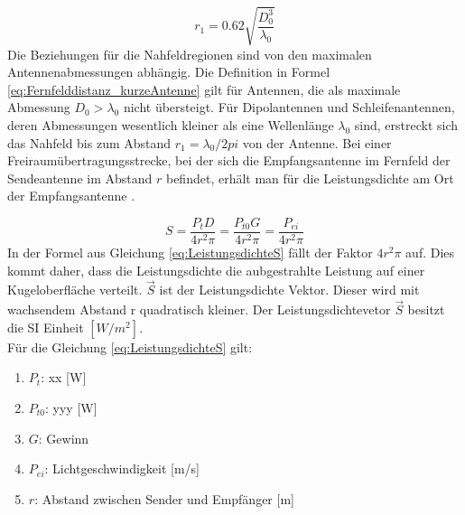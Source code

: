 \begin{equation}
r_{1}=0.62\sqrt{\dfrac{D_{0}^{3}}{\lambda_{0}}} \label{eq:Fernfelddistanz_kurzeAntenne}
\end{equation}
Die Beziehungen für die Nahfeldregionen sind von den maximalen Antennenabmessungen abhängig.  Die Definition in Formel \ref{eq:Fernfelddistanz_kurzeAntenne} gilt für Antennen, die als maximale Abmessung $D_{0}>\lambda_{0}$ nicht übersteigt.
Für Dipolantennen und Schleifenantennen, deren Abmessungen wesentlich kleiner als eine Wellenlänge $\lambda_{0}$ sind, erstreckt sich das Nahfeld bis zum  Abstand   $r_{1}=\lambda_{0}/2pi$ von der Antenne.
Bei einer Freiraumübertragungsstrecke, bei der sich die Empfangsantenne im Fernfeld der Sendeantenne im Abstand $r$ befindet, erhält man für die Leistungsdichte am Ort der Empfangsantenne \cite{meinke1992taschenbuch}.

\begin{equation}
S=\dfrac{P_{t}D}{4r^{2}\pi} = \dfrac{P_{t0}G}{4r^{2}\pi}=\dfrac{P_{ei}}{4r^{2}\pi}\label{eq:LeistungsdichteS}
\end{equation}
In der Formel aus Gleichung \ref{eq:LeistungsdichteS} fällt der Faktor $4r^{2}\pi$ auf. Dies kommt daher, dass die Leistungsdichte die aubgestrahlte Leistung auf einer Kugeloberfläche verteilt. $\vec{S}$ ist der Leistungsdichte Vektor. Dieser wird mit wachsendem Abstand r quadratisch kleiner. Der Leistungsdichtevetor $\vec{S}$ besitzt die SI Einheit  $[W/m^{2}]$.\\
Für die Gleichung \ref {eq:LeistungsdichteS} gilt:
\begin{enumerate}[leftmargin=2cm]
   \item[] $P_t$: xx [W]
   \item[] $P_{t0}$: yyy [W]
   \item[] $G$: Gewinn 
   \item[] $P_{ei}$: Lichtgeschwindigkeit  [m/s] 
   \item[] $r$: Abstand zwischen Sender und Empfänger [m]
\end{enumerate} 




